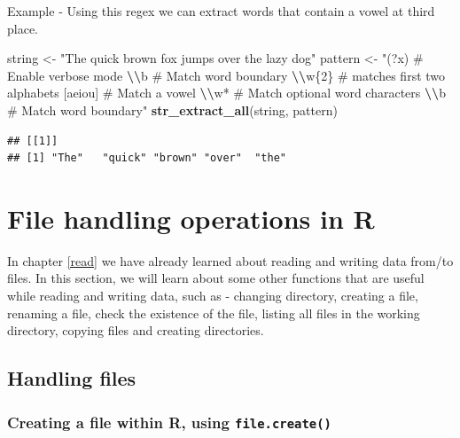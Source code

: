 \documentclass[
]{book}
\newenvironment{Shaded}{\begin{snugshade}}{\end{snugshade}}
\newcommand{\FunctionTok}[1]{\textcolor[rgb]{0.13,0.29,0.53}{\textbf{#1}}}
\newcommand{\NormalTok}[1]{#1}
\newcommand{\OtherTok}[1]{\textcolor[rgb]{0.56,0.35,0.01}{#1}}
\newcommand{\SpecialCharTok}[1]{\textcolor[rgb]{0.81,0.36,0.00}{\textbf{#1}}}
\newcommand{\StringTok}[1]{\textcolor[rgb]{0.31,0.60,0.02}{#1}}
\begin{document}
Example - Using this regex we can extract words that contain a vowel at third place.

\begin{Shaded}
\begin{Highlighting}[]
\NormalTok{string }\OtherTok{\textless{}{-}} \StringTok{"The quick brown fox jumps over the lazy dog"}
\NormalTok{pattern }\OtherTok{\textless{}{-}} \StringTok{"(?x)      \# Enable verbose mode}
\StringTok{            }\SpecialCharTok{\textbackslash{}\textbackslash{}}\StringTok{b       \# Match word boundary}
\StringTok{            }\SpecialCharTok{\textbackslash{}\textbackslash{}}\StringTok{w\{2\}    \# matches first two alphabets}
\StringTok{            [aeiou]   \# Match a vowel}
\StringTok{            }\SpecialCharTok{\textbackslash{}\textbackslash{}}\StringTok{w*      \# Match optional word characters}
\StringTok{            }\SpecialCharTok{\textbackslash{}\textbackslash{}}\StringTok{b       \# Match word boundary"}
\FunctionTok{str\_extract\_all}\NormalTok{(string, pattern)}
\end{Highlighting}
\end{Shaded}

\begin{verbatim}
## [[1]]
## [1] "The"   "quick" "brown" "over"  "the"
\end{verbatim}

\hypertarget{file}{%
\chapter{File handling operations in R}\label{file}}

In chapter \ref{read} we have already learned about reading and writing data from/to files. In this section, we will learn about some other functions that are useful while reading and writing data, such as - changing directory, creating a file, renaming a file, check the existence of the file, listing all files in the working directory, copying files and creating directories.

\hypertarget{handling-files}{%
\section{Handling files}\label{handling-files}}

\hypertarget{creating-a-file-within-r-using-file.create}{%
\subsection{\texorpdfstring{Creating a file within R, using \texttt{file.create()}}{Creating a file within R, using file.create()}}\label{creating-a-file-within-r-using-file.create}}
\end{document}
